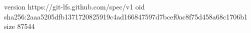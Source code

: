 version https://git-lfs.github.com/spec/v1
oid sha256:2aaa5205dfb1371720825919c4ad166847597d7bcef0ac8f75d458a68c1706b1
size 87544
